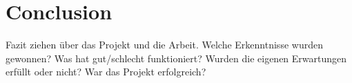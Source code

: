 
\chapter{Conclusion}\label{cha:Conclusion}
Fazit ziehen über das Projekt und die Arbeit. Welche Erkenntnisse wurden gewonnen? Was hat gut/schlecht funktioniert? Wurden die eigenen Erwartungen erfüllt oder nicht? War das Projekt erfolgreich?